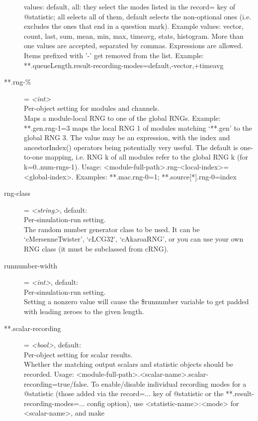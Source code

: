 \begin{description}
    values: default, all: they select the modes listed in the record= key of
    @statistic; all selects all of them, default selects the non-optional ones
    (i.e. excludes the ones that end in a question mark). Example values:
    vector, count, last, sum, mean, min, max, timeavg, stats, histogram. More
    than one values are accepted, separated by commas. Expressions are allowed.
    Items prefixed with '-' get removed from the list. Example:
    **.queueLength.result-recording-modes=default,-vector,+timeavg
\item[**.rng-\%] = \textit{<int>}\\
    Per-object setting for modules and channels.\\
    Maps a module-local RNG to one of the global RNGs. Example: **.gen.rng-1=3
    maps the local RNG 1 of modules matching `**.gen' to the global RNG 3. The
    value may be an expression, with the index and ancestorIndex() operators
    being potentially very useful. The default is one-to-one mapping, i.e. RNG
    k of all modules refer to the global RNG k (for k=0..num-rngs-1). Usage:
    <module-full-path>.rng-<local-index>=<global-index>. Examples:
    **.mac.rng-0=1; **.source[*].rng-0=index
\item[rng-class] = \textit{<string>}, default: \\
    Per-simulation-run setting.\\
    The random number generator class to be used. It can be `cMersenneTwister',
    `cLCG32', `cAkaroaRNG', or you can use your own RNG class (it must be
    subclassed from cRNG).
\item[runnumber-width] = \textit{<int>}, default: \\
    Per-simulation-run setting.\\
    Setting a nonzero value will cause the \$runnumber variable to get padded
    with leading zeroes to the given length.
\item[**.scalar-recording] = \textit{<bool>}, default: \\
    Per-object setting for scalar results.\\
    Whether the matching output scalars and statistic objects should be
    recorded. Usage:
    <module-full-path>.<scalar-name>.scalar-recording=true/false. To
    enable/disable individual recording modes for a @statistic (those added via
    the record=... key of @statistic or the **.result-recording-modes=...
    config option), use <statistic-name>:<mode> for <scalar-name>, and make

\end{description}
